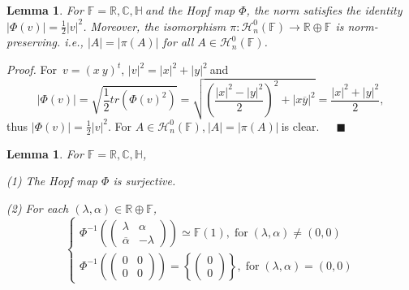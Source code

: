 \documentclass[a4paper]{article}%
\newtheorem{lemma}[theorem]{Lemma}
\newenvironment{proof}[1][Proof]{\noindent\textit{#1.} }{}
\begin{document}
\begin{lemma}
\label{norm} For $\mathbb{F}=\mathbb{R},\mathbb{C},\mathbb{H\ }$and the Hopf
map $\Phi$, the norm satisfies the identity $|\Phi(v)|=\frac{1}{2}|v|^{2}$.
Moreover, the isomorphism $\pi:\mathcal{H}_{n}^{0}(\mathbb{F})\rightarrow
\mathbb{R}\oplus\mathbb{F}$ is norm-preserving. i.e., $|A|=|\pi(A)|$ for all
$A\in\mathcal{H}_{n}^{0}(\mathbb{F})$.
\end{lemma}

\begin{proof}
For\ $v=\left(  x\ y\right)  ^{t}$, $|v|^{2}=\left\vert x\right\vert
^{2}+\left\vert y\right\vert ^{2}\ $and
\[
|\Phi(v)|=\sqrt{\frac{1}{2}tr(\Phi(v)^{2})}=\sqrt{\left(  \frac{|x|^{2}%
-|y|^{2}}{2}\right)  ^{2}+\left\vert x\overline{y}\right\vert ^{2}}%
=\frac{|x|^{2}+|y|^{2}}{2},
\]
thus $|\Phi(v)|=\frac{1}{2}|v|^{2}$. For $A\in\mathcal{H}_{n}^{0}(\mathbb{F}%
)$,$\ |A|=|\pi(A)|\ $is clear.\ \ \ $\blacksquare$
\end{proof}

\begin{lemma}
\label{surjection} For $\mathbb{F}=\mathbb{R},\mathbb{C},\mathbb{H}$,

(1) The Hopf map $\Phi$ is surjective.

(2) For each $(\lambda,\alpha)\in\mathbb{R}\oplus\mathbb{F}$,
\[%
\begin{cases}
\Phi^{-1}\left(
\begin{pmatrix}
\lambda & \alpha\\
\overline{\alpha} & -\lambda
\end{pmatrix}
\right)  \simeq\mathbb{F}(1),\;\text{for}\;(\lambda,\alpha)\neq(0,0)\\
\Phi^{-1}\left(
\begin{pmatrix}
0 & 0\\
0 & 0
\end{pmatrix}
\right)  =\left\{
\begin{pmatrix}
0\\
0
\end{pmatrix}
\right\}  ,\;\text{for}\;(\lambda,\alpha)=(0,0)
\end{cases}
\]

\end{lemma}
\end{document}
